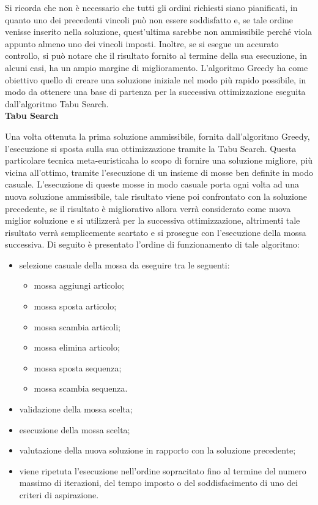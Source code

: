 Si ricorda che non è necessario che tutti gli ordini richiesti siano pianificati, in quanto uno dei precedenti vincoli può non essere soddisfatto e, se tale ordine venisse
inserito nella soluzione, quest'ultima sarebbe non ammissibile perché viola appunto almeno uno dei vincoli imposti. Inoltre, se si esegue un accurato controllo, si può notare che 
il risultato fornito al termine della sua esecuzione, in alcuni casi, ha un ampio margine di miglioramento. L'algoritmo Greedy ha come obiettivo quello di creare una
soluzione iniziale nel modo più rapido possibile, in modo da ottenere una base di partenza per la successiva ottimizzazione eseguita dall'algoritmo Tabu Search.\\


\textbf{Tabu Search}

Una volta ottenuta la prima soluzione ammissibile, fornita dall'algoritmo Greedy, l'esecuzione si sposta sulla sua ottimizzazione tramite la Tabu Search.
Questa particolare tecnica meta-euristica\glosp ha lo scopo di fornire una soluzione migliore, più vicina all'ottimo, tramite l'esecuzione di un insieme di mosse ben
definite in modo casuale. L'esecuzione di queste mosse in modo casuale porta ogni volta ad una nuova soluzione ammissibile, tale risultato viene poi confrontato con la soluzione
precedente, se il risultato è migliorativo allora verrà considerato come nuova miglior soluzione e si utilizzerà per la successiva ottimizzazione, altrimenti tale risultato 
verrà semplicemente scartato e si prosegue con l'esecuzione della mossa successiva. Di seguito è presentato l'ordine di funzionamento di tale algoritmo:
\begin{itemize}
    \item selezione casuale della mossa da eseguire tra le seguenti:
    \begin{itemize}
        \item mossa aggiungi articolo;
        \item mossa sposta articolo;
        \item mossa scambia articoli;
        \item mossa elimina articolo;
        \item mossa sposta sequenza; 
        \item mossa scambia sequenza.  
    \end{itemize}
    \item validazione della mossa scelta;
    \item esecuzione della mossa scelta;
    \item valutazione della nuova soluzione in rapporto con la soluzione precedente;
    \item viene ripetuta l'esecuzione nell'ordine sopracitato fino al termine del numero massimo di iterazioni, del tempo imposto o del soddisfacimento di uno dei criteri di
    aspirazione.\\
\end{itemize}


